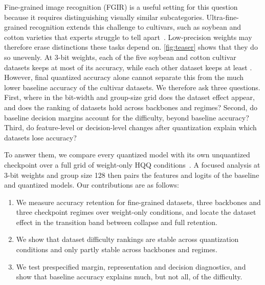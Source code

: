Fine-grained image recognition (FGIR) is a useful setting for this question because it requires distinguishing visually similar subcategories.
Ultra-fine-grained recognition extends this challenge to cultivars, such as soybean and cotton varieties that experts struggle to tell apart~\cite{yu2021benchmark,fang2024learning}.
Low-precision weights may therefore erase distinctions these tasks depend on.
\cref{fig:teaser} shows that they do so unevenly.
At 3-bit weights, each of the five soybean and cotton cultivar datasets keeps at most  of its accuracy, while each other dataset keeps at least .
However, final quantized accuracy alone cannot separate this from the much lower baseline accuracy of the cultivar datasets.
We therefore ask three questions.
First, where in the bit-width and group-size grid does the dataset effect appear, and does the ranking of datasets hold across backbones and regimes?
Second, do baseline decision margins account for the difficulty, beyond baseline accuracy?
Third, do feature-level or decision-level changes after quantization explain which datasets lose accuracy?

To answer them, we compare every quantized model with its own unquantized checkpoint over a full grid of weight-only HQQ conditions~\cite{badri2023hqq}.
A focused analysis at 3-bit weights and group size 128 then pairs the features and logits of the baseline and quantized models.
Our contributions are as follows:
\begin{enumerate}
  \item We measure accuracy retention for  fine-grained datasets, three backbones and three checkpoint regimes over  weight-only conditions, and locate the dataset effect in the transition band between collapse and full retention.
  \item We show that dataset difficulty rankings are stable across quantization conditions and only partly stable across backbones and regimes.
  \item We test prespecified margin, representation and decision diagnostics, and show that baseline accuracy explains much, but not all, of the difficulty.
\end{enumerate}
